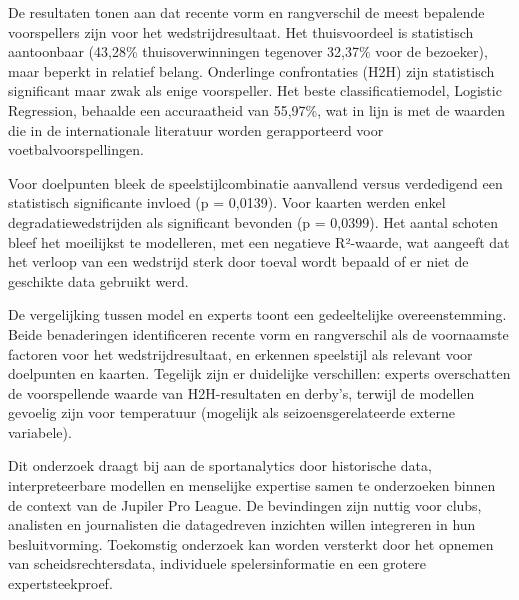 De resultaten tonen aan dat recente vorm en rangverschil de meest bepalende
voorspellers zijn voor het wedstrijdresultaat. Het thuisvoordeel is statistisch aantoonbaar
(43,28\% thuisoverwinningen tegenover 32,37\% voor de bezoeker), maar beperkt in relatief belang.
Onderlinge confrontaties (H2H) zijn statistisch significant maar zwak als enige voorspeller.
Het beste classificatiemodel, Logistic Regression, behaalde een accuraatheid van 55,97\%,
wat in lijn is met de waarden die in de internationale literatuur worden gerapporteerd voor voetbalvoorspellingen.

\vspace{5pt}

Voor doelpunten bleek de speelstijlcombinatie aanvallend versus verdedigend een statistisch significante
invloed (p = 0,0139). Voor kaarten werden enkel degradatiewedstrijden als significant bevonden (p = 0,0399).
Het aantal schoten bleef het moeilijkst te modelleren, met een negatieve R²-waarde, 
wat aangeeft dat het verloop van een wedstrijd sterk door toeval wordt bepaald of er niet de geschikte data gebruikt werd.

\vspace{5pt}

De vergelijking tussen model en experts toont een gedeeltelijke overeenstemming.
Beide benaderingen identificeren recente vorm en rangverschil als de voornaamste factoren voor het wedstrijdresultaat,
en erkennen speelstijl als relevant voor doelpunten en kaarten.
Tegelijk zijn er duidelijke verschillen: experts overschatten de voorspellende waarde van H2H-resultaten en derby's,
terwijl de modellen gevoelig zijn voor temperatuur (mogelijk als seizoensgerelateerde externe variabele).

\vspace{5pt}

Dit onderzoek draagt bij aan de sportanalytics door historische data, 
interpreteerbare modellen en menselijke expertise samen te onderzoeken binnen de context van de Jupiler Pro League.
De bevindingen zijn nuttig voor clubs, analisten en journalisten die datagedreven inzichten willen integreren in hun
besluitvorming. Toekomstig onderzoek kan worden versterkt door het opnemen van scheidsrechtersdata,
individuele spelersinformatie en een grotere expertsteekproef.
